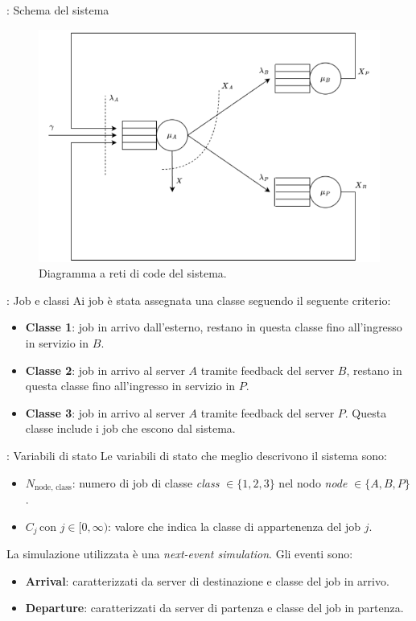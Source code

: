 \begin{frame}{\subsecname: Schema del sistema}
    \begin{figure}
        \centering
        \includegraphics[width=0.75\linewidth]{figs/conceptual_system.png}
        \caption{Diagramma a reti di code del sistema.}
        \label{fig:enter-label}
    \end{figure}
\end{frame}

\begin{frame}{\subsecname: Job e classi}
    Ai job è stata assegnata una classe seguendo il seguente criterio:
    \begin{itemize}
        \item \textbf{Classe 1}: job in arrivo dall'esterno, restano in questa classe fino all'ingresso in servizio in $B$.
        \item \textbf{Classe 2}: job in arrivo al server $A$ tramite feedback del server $B$, restano in questa classe fino all'ingresso in servizio in $P$.
        \item \textbf{Classe 3}: job in arrivo al server $A$ tramite feedback del server $P$. Questa classe include i job che escono dal sistema.
    \end{itemize}
\end{frame}

\begin{frame}{\subsecname: Variabili di stato}
    Le variabili di stato che meglio descrivono il sistema sono:
    \begin{itemize}
        \item $N_{\text{node, class}}$: numero di job di classe \textit{class} $\in \{1,2,3\}$ nel nodo \textit{node} $\in \{A,B,P\}$.
        \item $C_j \, \text{con } j \in [0, \infty)$: valore che indica la classe di appartenenza del job $j$.
    \end{itemize}
    La simulazione utilizzata è una \textit{next-event simulation}. Gli eventi sono:
    \begin{itemize}
        \item \textbf{Arrival}: caratterizzati da server di destinazione e classe del job in arrivo.
        \item \textbf{Departure}: caratterizzati da server di partenza e classe del job in partenza.
    \end{itemize}
\end{frame}

